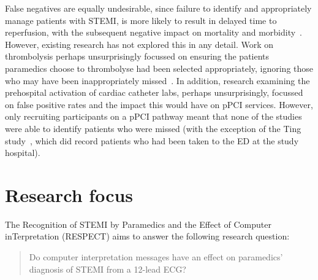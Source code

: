 False negatives are equally undesirable, since failure to identify and appropriately manage patients with STEMI, is more likely to result in delayed time to reperfusion, with the subsequent negative impact on mortality and morbidity~\citep{department_of_health_treatment_2008}. However, existing research has not explored this in any detail. Work on thrombolysis perhaps unsurprisingly focussed on ensuring the patients paramedics choose to thrombolyse had been selected appropriately, ignoring those who may have been inappropriately missed~\citep{khan_paramedic-led_2009,pitt_prehospital_2002,smith_paramedic_2010}. In addition, research examining the prehospital activation of cardiac catheter labs, perhaps unsurprisingly, focussed on false positive rates and the impact this would have on pPCI services. However, only recruiting participants on a pPCI pathway meant that none of the studies were able to identify patients who were missed (with the exception of the Ting study~\citep{ting_abstract_2009}, which did record patients who had been taken to the ED at the study hospital). 

\section{Research focus}
\label{researchfocus}

The Recognition of STEMI by Paramedics and the Effect of Computer inTerpretation (RESPECT) aims to answer the following research question:

\begin{quote}

Do computer interpretation messages have an effect on paramedics' diagnosis of STEMI from a 12-lead ECG?
\end{quote}
